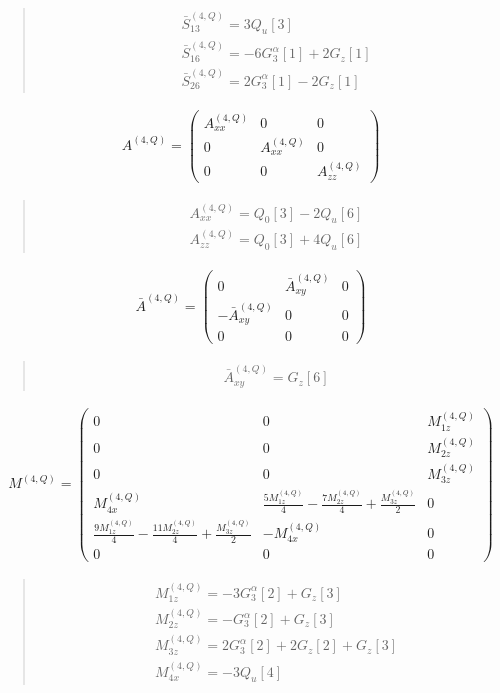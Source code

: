 \documentclass[fleqn,10pt]{jsarticle}
\begin{document}
\begin{quote}
\begin{align*}
& \bar{S}^{(4,Q)}_{13} = 3 Q_{u}[3] \\
& \bar{S}^{(4,Q)}_{16} = - 6 G_{3}^{\alpha}[1] + 2 G_{z}[1] \\
& \bar{S}^{(4,Q)}_{26} = 2 G_{3}^{\alpha}[1] - 2 G_{z}[1]
\end{align*}
\end{quote}
\begin{align*}
A^{(4,Q)} = \begin{pmatrix} A^{(4,Q)}_{xx} & 0 & 0 \\ 0 & A^{(4,Q)}_{xx} & 0 \\ 0 & 0 & A^{(4,Q)}_{zz} \end{pmatrix}
\end{align*}
\begin{quote}
\begin{align*}
& A^{(4,Q)}_{xx} = Q_{0}[3] - 2 Q_{u}[6] \\
& A^{(4,Q)}_{zz} = Q_{0}[3] + 4 Q_{u}[6]
\end{align*}
\end{quote}
\begin{align*}
\bar{A}^{(4,Q)} = \begin{pmatrix} 0 & \bar{A}^{(4,Q)}_{xy} & 0 \\ - \bar{A}^{(4,Q)}_{xy} & 0 & 0 \\ 0 & 0 & 0 \end{pmatrix}
\end{align*}
\begin{quote}
\begin{align*}
& \bar{A}^{(4,Q)}_{xy} = G_{z}[6]
\end{align*}
\end{quote}
\begin{align*}
M^{(4,Q)} = \begin{pmatrix} 0 & 0 & M^{(4,Q)}_{1z} \\ 0 & 0 & M^{(4,Q)}_{2z} \\ 0 & 0 & M^{(4,Q)}_{3z} \\ M^{(4,Q)}_{4x} & \frac{5 M^{(4,Q)}_{1z}}{4} - \frac{7 M^{(4,Q)}_{2z}}{4} + \frac{M^{(4,Q)}_{3z}}{2} & 0 \\ \frac{9 M^{(4,Q)}_{1z}}{4} - \frac{11 M^{(4,Q)}_{2z}}{4} + \frac{M^{(4,Q)}_{3z}}{2} & - M^{(4,Q)}_{4x} & 0 \\ 0 & 0 & 0 \end{pmatrix}
\end{align*}
\begin{quote}
\begin{align*}
& M^{(4,Q)}_{1z} = - 3 G_{3}^{\alpha}[2] + G_{z}[3] \\
& M^{(4,Q)}_{2z} = - G_{3}^{\alpha}[2] + G_{z}[3] \\
& M^{(4,Q)}_{3z} = 2 G_{3}^{\alpha}[2] + 2 G_{z}[2] + G_{z}[3] \\
& M^{(4,Q)}_{4x} = - 3 Q_{u}[4]
\end{align*}
\end{quote}
\end{document}
